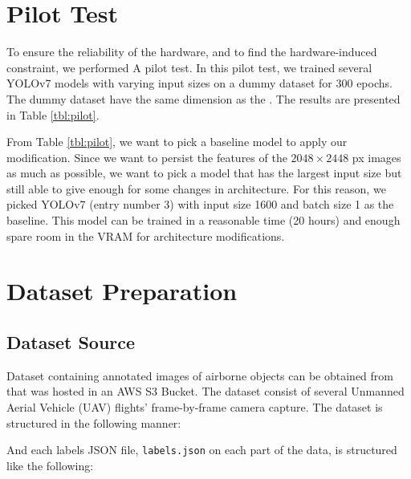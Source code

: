 \section{Pilot Test}
To ensure the reliability of the hardware, and to find the hardware-induced constraint, we performed A
pilot test.
In this pilot test, we trained several YOLOv7 models with varying input sizes on a dummy dataset for 300 epochs.
The dummy dataset have the same dimension as the \textcite{aot_dataset}.
The results are presented in Table \ref{tbl:pilot}. 
\begin{table}[H]
  \centering
  \label{tbl:pilot}
  \vspace{-1ex}
  \begin{adjustbox}{width=\textwidth}
    
  \end{adjustbox}
\end{table}

From Table \ref{tbl:pilot}, we want to pick a baseline model to apply our modification.
Since we want to persist the features of the $2048\times 2448$ px images as much as possible, 
we want to pick a model that has the largest input size but still able to give enough for some 
changes in architecture. 
For this reason, we picked YOLOv7 (entry number 3) with input size 1600 and batch size 1 as the baseline.
This model can be trained in a reasonable time (20 hours) and enough spare room in the VRAM for architecture modifications.


\section{Dataset Preparation}
\label{section:dataset}

  \subsection{Dataset Source}
  \label{section:datasetsource}
  Dataset containing annotated images of airborne objects can be obtained from \textcite{aot_dataset}
  that was hosted in an AWS S3 Bucket.
  The dataset consist of several Unmanned Aerial Vehicle (UAV) flights' frame-by-frame camera capture.
  The dataset is structured in the following manner:

  

  And each labels JSON file, \verb|labels.json| on each part of the data, is structured like the following:

  

